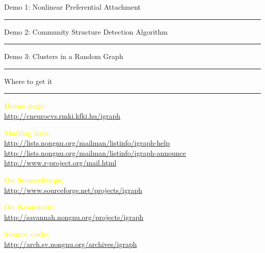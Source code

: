 \documentclass[landscape]{foils}
\newcommand{\stitle}[1]{{\color{yellow}\centering\Large #1\par\vspace*{10pt}\hrule}}
\renewcommand{\emph}[1]{\textcolor{yellow}{\bf #1}}
\begin{document}
\newpage
\stitle{Demo 1: Nonlinear Preferential Attachment}

\newpage
\stitle{Demo 2: Community Structure Detection Algorithm}

\newpage
\stitle{Demo 3: Clusters in a Random Graph}

\newpage
\stitle{Where to get it}

\emph{Home page:}\\
\url{http://cneurocvs.rmki.kfki.hu/igraph}
\vfill

\emph{Mailing lists:}\\
\url{http://lists.nongnu.org/mailman/listinfo/igraph-help}\\
\url{http://lists.nongnu.org/mailman/listinfo/igraph-announce}\\
\url{http://www.r-project.org/mail.html}
\vfill

\emph{On SourceForge:}\\
\url{http://www.sourceforge.net/projects/igraph}
\vfill

\emph{On Savannah:}\\
\url{http://savannah.nongnu.org/projects/igraph}
\vfill

\emph{Source code:}\\
\url{http://arch.sv.nongnu.org/archives/igraph}
\vfill
\end{document}
